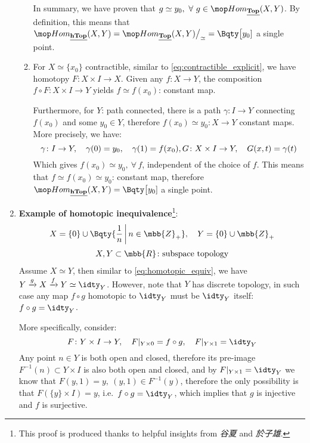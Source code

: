 \documentclass[a4paper,10pt]{article}
\begin{document}
\begin{enumerate}
\begin{enumerate}
	In summary, we have proven that $g\simeq y_0,\ \forall\ g\in\Hom_{\Cat{Top}}(X,Y)$. By definition, this means that $\Hom_{\Cat{hTop}}(X,Y) = \Hom_{\Cat{Top}}(X,Y)\big/_{\simeq} = \Bqty\big{[y_0]}$ a single point. \qedfull[(c)]
	
	\item For $X\simeq \{x_0\}$ contractible, similar to \eqref{eq:contractible_explicit}, we have homotopy $F\colon X\times I \to X$. Given any $f\colon X\to Y$, the composition $f\circ F\colon X\times I \to Y$ yields $f\simeq f(x_0)$: constant map. 
	
	Furthermore, for $Y$: path connected, there is a path $\gamma\colon I\to Y$ connecting $f(x_0)$ and some $y_0\in Y$, therefore $f(x_0) \simeq y_0\colon X\to Y$ constant maps. More precisely, we have:
	\begin{equation}
		\gamma\colon I\to Y,\quad
			\gamma(0) = y_0,\quad
			\gamma(1) = f(x_0),\\
		G\colon X\times I\to Y,\quad
			G(x,t) = \gamma(t)
	\end{equation}
	Which gives $f(x_0) \simeq y_0,\ \forall\,f$, independent of the choice of $f$. This means that $f\simeq f(x_0) \simeq y_0$: constant map, therefore $\Hom_{\Cat{hTop}}(X,Y) = \Bqty\big{[y_0]}$ a single point. \qedfull[(d)]
	
	\end{enumerate}
	
	\item \textbf{Example of homotopic inequivalence}\footnote{
		This proof is produced thanks to helpful insights from \textit{谷夏} and \textit{於子雄}. 
	}:
	\begin{equation}
	\begin{gathered}
		X = \{0\} \cup \Bqty{
			\frac{1}{n} \,\bigg|\, n\in\mbb{Z}_+
		},\quad
		Y = \{0\} \cup \mbb{Z}_+\\[.5ex]
		X,Y\subset\mbb{R}\colon
		\text{subspace topology}
	\end{gathered}
	\end{equation}
	Assume $X\simeq Y$, then similar to \eqref{eq:homotopic_equiv}, we have $
		Y\xrightarrow{g}X
		\xrightarrow{f}Y
		\simeq\idty_Y
	$. However, note that $Y$ has discrete topology, in such case any map $f\circ g$ homotopic to $\idty_Y$ must be $\idty_Y$ itself: $f\circ g = \idty_Y$. 
	
	More specifically, consider:
	\begin{equation}
		F \colon Y\times I\to Y,\quad
		F|_{Y\times 0} = f\circ g,\quad
		F|_{Y\times 1} = \idty_Y
	\end{equation}
	Any point $n\in Y$ is both open and closed, therefore its pre-image $F^{-1}(n)\subset Y\times I$ is also both open and closed, and by $F|_{Y\times 1} = \idty_Y$ we know that $F(y,1) = y,\ (y,1)\in F^{-1}(y)$, therefore the only possibility is that $F(\{y\}\times I) = y$, i.e.\ $f\circ g=\idty_Y$, which implies that $g$ is injective and $f$ is surjective. 
	

\end{enumerate}
\end{document}

